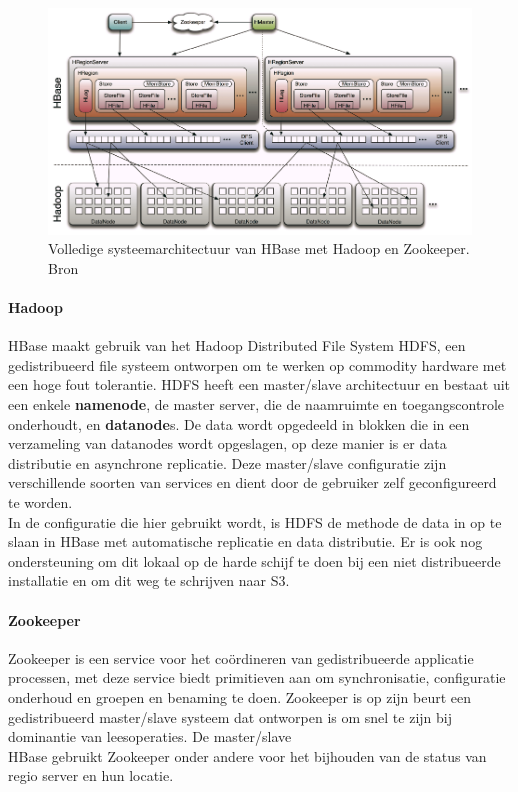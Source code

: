 \begin{figure}[h!]
\centering
\includegraphics[width=\linewidth]{img/Hbase-structure.png}
\caption{Volledige systeemarchitectuur van HBase met Hadoop en Zookeeper. Bron \cite{ChinHBaseComprehensive}}
\label{fig:Hbase-structure}
\end{figure}

\paragraph{Hadoop\cite{borthakur2007hadoop}} HBase maakt gebruik van het Hadoop Distributed File System \gls{HDFS}, een gedistribueerd file systeem ontworpen om te werken op commodity hardware met een hoge fout tolerantie. \gls{HDFS} heeft een master/slave architectuur en bestaat uit een enkele \textbf{namenode}, de master server, die de naamruimte en toegangscontrole onderhoudt, en \textbf{datanode}s. De data wordt opgedeeld in blokken die in een verzameling van datanodes wordt opgeslagen, op deze manier is er data distributie en asynchrone replicatie. Deze master/slave configuratie zijn verschillende soorten van services en dient door de gebruiker zelf geconfigureerd te worden. \\
In de configuratie die hier gebruikt wordt, is \gls{HDFS} de methode de data in op te slaan in HBase met automatische replicatie en data distributie. Er is ook nog ondersteuning om dit lokaal op de harde schijf te doen bij een niet distribueerde installatie en om dit weg te schrijven naar S3.\cite{george2011hbase}

\paragraph{Zookeeper\cite{hunt2010zookeeper}} Zookeeper is een service voor het coördineren van gedistribueerde applicatie processen, met deze service biedt primitieven aan om synchronisatie, configuratie onderhoud en groepen en benaming te doen. Zookeeper is op zijn beurt een gedistribueerd master/slave systeem dat ontworpen is om snel te zijn bij dominantie van leesoperaties. De master/slave \\
HBase gebruikt Zookeeper onder andere voor het bijhouden van de status van regio server en hun locatie. \cite{george2011hbase}

